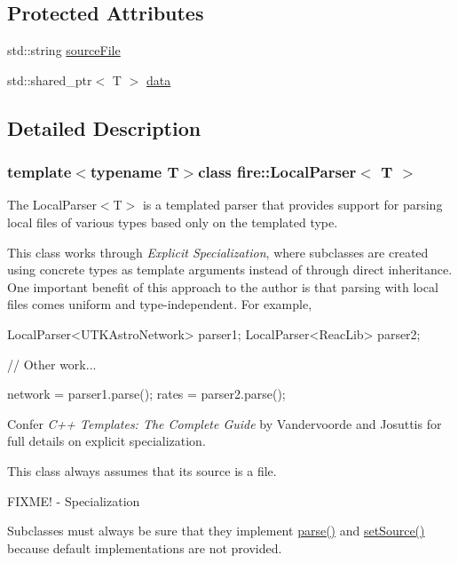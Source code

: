 \subsection*{Protected Attributes}
\begin{DoxyCompactItemize}
\item 
std\+::string \hyperlink{a00029_acf921ee916266efe70be5b24bec37fce}{source\+File}
\item 
std\+::shared\+\_\+ptr$<$ T $>$ \hyperlink{a00029_af8f722c7e35378c69e76e4275d384d86}{data}
\end{DoxyCompactItemize}


\subsection{Detailed Description}
\subsubsection*{template$<$typename T$>$class fire\+::\+Local\+Parser$<$ T $>$}

The Local\+Parser$<$\+T$>$ is a templated parser that provides support for parsing local files of various types based only on the templated type.

This class works through {\itshape Explicit Specialization}, where subclasses are created using concrete types as template arguments instead of through direct inheritance. One important benefit of this approach to the author is that parsing with local files comes uniform and type-\/independent. For example,


\begin{DoxyCode}
LocalParser<UTKAstroNetwork> parser1;
LocalParser<ReacLib> parser2;

\textcolor{comment}{// Other work...}

network = parser1.parse();
rates = parser2.parse();
\end{DoxyCode}


Confer {\itshape C++ Templates\+: The Complete Guide} by Vandervoorde and Josuttis for full details on explicit specialization.

This class always assumes that its source is a file.

F\+I\+X\+M\+E! -\/ Specialization

Subclasses must always be sure that they implement \hyperlink{a00029_abd8929aea06c2dda40256d2e58236650}{parse()} and \hyperlink{a00029_afcaec6429fdd6e5d53642a32c001ff73}{set\+Source()} because default implementations are not provided. 


